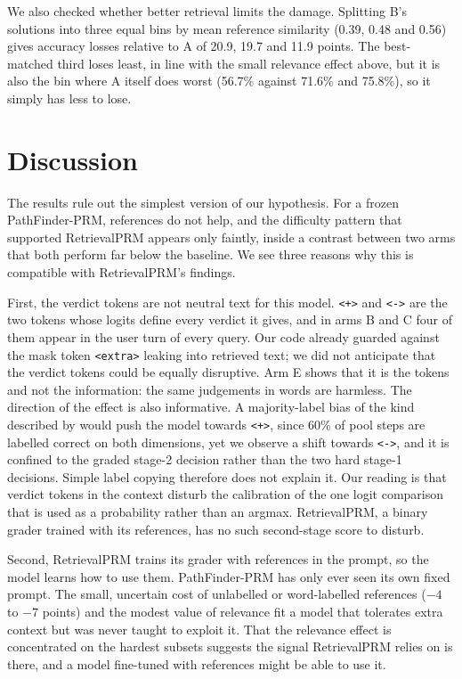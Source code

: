 \documentclass[11pt]{article}
\newcommand{\pos}{\texttt{<+>}}
\newcommand{\negt}{\texttt{<->}}
\newcommand{\extra}{\texttt{<extra>}}
\newcommand{\arm}[1]{\textsc{#1}}
\begin{document}
We also checked whether better retrieval limits the damage. Splitting \arm{B}'s solutions into
three equal bins by mean reference similarity (0.39, 0.48 and 0.56) gives accuracy losses
relative to \arm{A} of 20.9, 19.7 and 11.9 points. The best-matched third loses least, in line
with the small relevance effect above, but it is also the bin where \arm{A} itself does worst
(56.7\% against 71.6\% and 75.8\%), so it simply has less to lose.

\section{Discussion}
\label{sec:discussion}

The results rule out the simplest version of our hypothesis. For a frozen PathFinder-PRM,
references do not help, and the difficulty pattern that supported RetrievalPRM appears only
faintly, inside a contrast between two arms that both perform far below the baseline. We see
three reasons why this is compatible with RetrievalPRM's findings.

First, the verdict tokens are not neutral text for this model. \pos{} and \negt{} are the two
tokens whose logits define every verdict it gives, and in arms \arm{B} and \arm{C} four of them
appear in the user turn of every query. Our code already guarded against the mask token \extra{}
leaking into retrieved text; we did not anticipate that the verdict tokens could be equally
disruptive. Arm \arm{E} shows that it is the tokens and not the information: the same judgements
in words are harmless. The direction of the effect is also informative. A majority-label bias of
the kind described by \citet{zhao2021calibrate} would push the model towards \pos, since 60\% of
pool steps are labelled correct on both dimensions, yet we observe a shift towards \negt, and it
is confined to the graded stage-2 decision rather than the two hard stage-1 decisions. Simple
label copying therefore does not explain it. Our reading is that verdict tokens in the context
disturb the calibration of the one logit comparison that is used as a probability rather than
an argmax. RetrievalPRM, a binary grader trained with its references, has no such
second-stage score to disturb.

Second, RetrievalPRM trains its grader with references in the prompt, so the model learns how
to use them. PathFinder-PRM has only ever seen its own fixed prompt. The small, uncertain cost
of unlabelled or word-labelled references ($-4$ to $-7$ points) and the modest value of
relevance fit a model that tolerates extra context but was never taught to exploit it. That the
relevance effect is concentrated on the hardest subsets suggests the signal RetrievalPRM relies
on is there, and a model fine-tuned with references might be able to use it.
\end{document}
